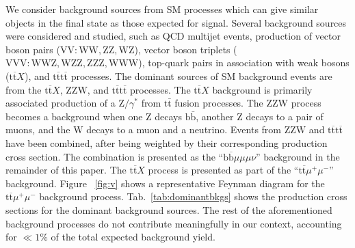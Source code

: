 We consider background sources from SM processes which can give similar objects in the final state as those expected for signal. Several background sources were considered and studied, such as QCD multijet events, production of vector boson pairs ($\mathrm{VV: WW, ZZ, WZ}$), vector boson triplets ($\mathrm{VVV: WWZ, WZZ, ZZZ, WWW}$), top-quark pairs in association with weak bosons ($\mathrm{t}\overline{\mathrm{t}}X$), and $\mathrm{t}\overline{\mathrm{t}}\mathrm{t}\overline{\mathrm{t}}$ processes. The  dominant sources of SM background events are from the $\mathrm{t}\overline{\mathrm{t}}X$, $\mathrm{ZZW}$, and $\mathrm{t}\overline{\mathrm{t}}\mathrm{t}\overline{\mathrm{t}}$ processes. The $\mathrm{t}\overline{\mathrm{t}}X$ background is primarily associated production of a $\mathrm{Z}/\gamma^{*}$ from $\mathrm{t}\bar{\mathrm{t}}$ fusion processes. The $\mathrm{ZZW}$ process becomes a background when one $\mathrm{Z}$ decays $\mathrm{b}\bar{\mathrm{b}}$, another $\mathrm{Z}$ decays to a pair of muons, and the W decays to a muon and a neutrino. 
Events from $\mathrm{ZZW}$ and $\mathrm{t}\overline{\mathrm{t}}\mathrm{t}\overline{\mathrm{t}}$ have been combined, after being weighted by their corresponding production cross section. The combination is presented as the ``$\mathrm{b} \overline{\mathrm{b}}\mu\mu\mu\nu$'' background in the remainder of this paper. The $\mathrm{t}\overline{\mathrm{t}}X$ process is presented as part of the ``$\mathrm{t}\overline{\mathrm{t}}\mu^{+}\mu^{-}$'' background. Figure ~\ref{fig:v} shows a representative Feynman diagram for the $\mathrm{t}\overline{\mathrm{t}}\mu^{+}\mu^{-}$ background process. Tab.~\ref{tab:dominantbkgs} shows the production cross sections for the dominant background sources. The rest of the aforementioned background processes do not contribute meaningfully in our context, accounting for $\ll 1\%$ of the total expected background yield.

